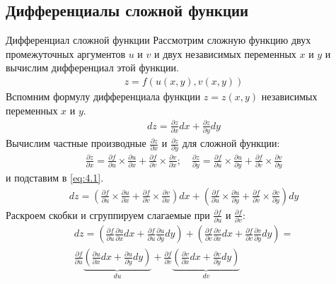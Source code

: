 \subsection{Дифференциалы сложной функции} \label{part:2.6}

\begin{tbox}{Дифференциал сложной функции}
	Рассмотрим сложную функцию двух промежуточных аргументов $u$ и $v$ и двух независимых переменных $x$ и $y$ и вычислим дифференциал этой функции.
	\begin{align*}		\label{eq:4.1}
		z = f(u(x, y), v(x, y))
	\end{align*}
	Вспомним формулу дифференциала функции $z = z(x,y)$ независимых переменных $x$ и $y$.
	\begin{align}
		dz = \frac{\partial z}{\partial x} dx + \frac{\partial z}{\partial y} dy
	\end{align}
	Вычислим частные производные \(\frac{\partial z}{\partial x}\) и \(\frac{\partial z}{\partial y}\) для сложной функции:
	\begin{align*}
		\frac{\partial z}{\partial x} = \frac{\partial f}{\partial u} \times \frac{\partial u}{\partial x} + \frac{\partial f}{\partial v} \times \frac{\partial v}{\partial x}; \quad \frac{\partial z}{\partial y} = \frac{\partial f}{\partial u} \times \frac{\partial u}{\partial y} + \frac{\partial f}{\partial v} \times \frac{\partial v}{\partial y}
	\end{align*}
	и подставим в \cref{eq:4.1}.
	\begin{align*}
		dz = \left(\frac{\partial f}{\partial u} \times \frac{\partial u}{\partial x} + \frac{\partial f}{\partial v} \times \frac{\partial v}{\partial x}\right) dx + \left(\frac{\partial f}{\partial u} \times \frac{\partial u}{\partial y} + \frac{\partial f}{\partial v} \times \frac{\partial v}{\partial y}\right)dy
	\end{align*}
	Раскроем скобки и сгруппируем слагаемые при $\frac{\partial f}{\partial u}$ и $\frac{\partial f}{\partial v}$:
	\begin{equation}	\label{eq:4.2}
		\begin{split}
			dz = \left(\frac{\partial f}{\partial u}  \frac{\partial u}{\partial x} dx + \frac{\partial f}{\partial u}  \frac{\partial u}{\partial y} dy \right) + \left(\frac{\partial f}{\partial v}  \frac{\partial v}{\partial x}dx + \frac{\partial f}{\partial v}  \frac{\partial v}{\partial y} dy\right) = \\
			\frac{\partial f}{\partial u} \underbrace{\left(\frac{\partial u}{\partial x} dx + \frac{\partial u}{\partial y} dy\right)}_{du} + \frac{\partial f}{\partial v}  \underbrace{\left(\frac{\partial v}{\partial x} dx + \frac{\partial v}{\partial y} dy\right)}_{dv}

\end{split}
\end{equation}
\end{tbox}
